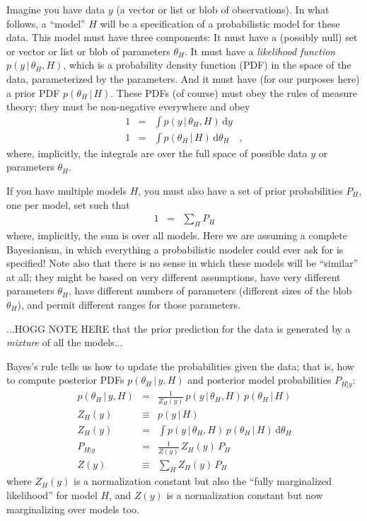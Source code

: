\documentclass[12pt]{article}
\newcommand{\dd}{\mathrm{d}}
\newcommand{\given}{\,|\,}
\begin{document}
Imagine you have data $y$ (a vector or list or blob of observations).
In what follows, a ``model'' $H$ will be a specification of a probabilistic model for these data.
This model must have three components:
It must have a (possibly null) set or vector or list or blob of parameters $\theta_H$.
It must have a \emph{likelihood function} $p(y\given\theta_H,H)$, which is
  a probability density function (PDF) in the space of the data, parameterized by the parameters.
And it must have (for our purposes here) a prior PDF $p(\theta_H\given H)$.
These PDFs (of course) must obey the rules of measure theory;
  they must be non-negative everywhere and obey
\begin{eqnarray}
1 &=& \int p(y\given\theta_H,H)\,\dd y
\\
1 &=& \int p(\theta_H\given H)\,\dd \theta_H
\quad ,
\end{eqnarray}
where, implicitly,
the integrals are over the full space of possible data $y$ or parameters $\theta_H$.

If you have multiple models $H$,
  you must also have a set of prior probabilities $P_H$, one per model,
  set such that
\begin{eqnarray}
1 &=& \sum_H P_H
\end{eqnarray}
where, implicitly,
the sum is over all models.
Here we are assuming a complete Bayesianism,
  in which everything a probabilistic modeler could ever ask for is specified!
Note also that there is no sense in which these models will be ``similar'' at all;
  they might be based on very different assumptions,
  have very different parameters $\theta_H$,
  have different numbers of parameters (different sizes of the blob $\theta_H$),
  and permit different ranges for those parameters.

...HOGG NOTE HERE that the prior prediction for the data is generated by a \emph{mixture} of all the models...

Bayes's rule tells us how to update the probabilities given the data;
  that is, how to compute posterior PDFs $p(\theta_H\given y,H)$
  and posterior model probabilities $P_{H|y}$:
\begin{eqnarray}
p(\theta_H\given y,H) &=& \frac{1}{Z_H(y)}\,p(y\given\theta_H,H)\,p(\theta_H\given H)
\\
Z_H(y) &\equiv& p(y\given H)
\\
Z_H(y) &=& \int p(y\given\theta_H,H)\,p(\theta_H\given H)\,\dd\theta_H
\\
P_{H|y} &=& \frac{1}{Z(y)}\,Z_H(y)\,P_H
\\
Z(y) &\equiv& \sum_H Z_H(y)\,P_H
\end{eqnarray}
where
$Z_H(y)$ is a normalization constant
  but also the ``fully marginalized likelihood'' for model $H$, and
$Z(y)$ is a normalization constant but
  now marginalizing over models too.
\end{document}
